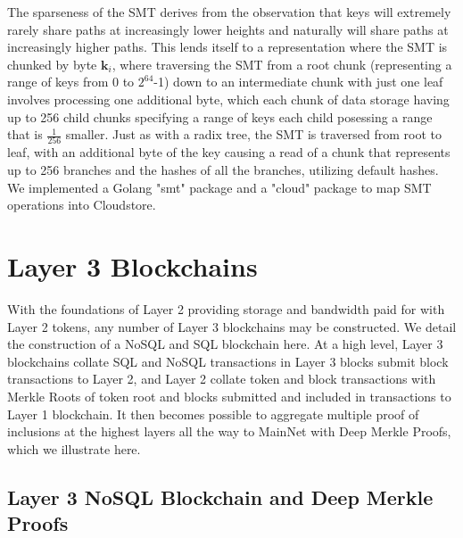 \documentclass{article}
\begin{document}
The sparseness of the SMT derives from the observation that keys will extremely rarely share paths at increasingly lower heights and naturally will share paths at increasingly higher paths.  This lends itself to a representation where the SMT is chunked by byte $\mathbf{k}_i$, where traversing the SMT from a root chunk (representing a range of keys from 0 to $2^{64}$-1) down to an intermediate chunk with just one leaf involves processing one additional byte, which each chunk of data storage having up to 256 child chunks specifying a range of keys each child posessing a range that is $\frac{1}{256}$ smaller.  Just as with a radix tree, the SMT is traversed from root to leaf, with an additional byte of the key causing a read of a chunk that represents up to 256 branches and the hashes of all the branches, utilizing default hashes.  We implemented a Golang "smt" package and a "cloud" package to map SMT operations into Cloudstore.

\section{Layer 3 Blockchains\label{sec:layer3}}

With the foundations of Layer 2 providing storage and bandwidth paid for with Layer 2 tokens, any number of Layer 3 blockchains may be constructed.  We detail the construction of a NoSQL and SQL blockchain here.  At a high level, Layer 3 blockchains collate SQL and NoSQL transactions in Layer 3 blocks submit block transactions to Layer 2, and Layer 2 collate token and block transactions with Merkle Roots of token root and blocks submitted and included in transactions to Layer 1 blockchain.  It then becomes possible to aggregate multiple proof of inclusions at the highest layers all the way to MainNet with Deep Merkle Proofs, which we illustrate here.

\subsection{Layer 3 NoSQL Blockchain and Deep Merkle Proofs}
\end{document}
